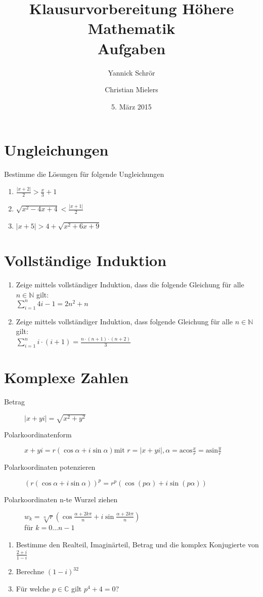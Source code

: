 \documentclass[11pt, a4paper]{article}
\title{Klausurvorbereitung Höhere Mathematik \\ Aufgaben}
\author{Yannick Schrör \and Christian Mielers}
\date{5. März 2015}
\providecommand{\abs}[1]{\left\lvert#1\right\rvert}
\providecommand{\acos}{\mathrm{acos}}
\providecommand{\asin}{\mathrm{asin}}
\begin{document}
\maketitle

\section{Ungleichungen}
Bestimme die Lösungen für folgende Ungleichungen
\begin{enumerate}
	\item $\displaystyle \frac{\abs{x+2}}{2} > \frac{x}{3} + 1$
	\item $\displaystyle \sqrt{x^2 - 4x + 4} < \frac{\abs{x+1}}{2}$
	\item $\displaystyle \abs{x+5} > 4 + \sqrt{x^2 + 6x + 9}$
\end{enumerate}

\section{Vollständige Induktion}
\begin{enumerate}[label=\alph*)]
	\item Zeige mittels vollständiger Induktion, dass die folgende Gleichung für alle $n \in \mathbb{N}$ gilt: \\
		$\displaystyle \sum_{i=1}^n 4i - 1 = 2n^2 + n$
	\item Zeige mittels vollständiger Induktion, dass folgende Gleichung für alle $n \in \mathbb{N}$ gilt: \\
		$\displaystyle \sum_{i=1}^n i \cdot (i + 1) = \frac{n\cdot(n+1)\cdot(n+2)}{3}$
\end{enumerate}

\section{Komplexe Zahlen}
	\begin{description}
		\item[Betrag] $\abs{x+yi} = \sqrt{x^2 + y^2}$
		\item[Polarkoordinatenform] $x+yi = r \left( \cos{\alpha} + i \sin{\alpha} \right) \text{mit } r=\abs{x+yi}, \alpha = \acos{\frac{x}{r}} = \asin{\frac{y}{r}}$
		\item[Polarkoordinaten potenzieren] $\left( r \left( \cos{\alpha} + i \sin{\alpha} \right) \right)^{p} = r^p \left( \cos \left( p \alpha \right) + i \sin \left(p \alpha \right) \right)$
		\item[Polarkoordinaten n-te Wurzel ziehen] $w_k = \sqrt[n]{r} \left( \cos \frac{\alpha + 2k\pi}{n} + i \sin \frac{\alpha + 2k\pi}{n} \right)$ \\ für $k = 0 \dots n-1$
	\end{description}
	\begin{enumerate}
		\item Bestimme den Realteil, Imaginärteil, Betrag und die komplex Konjugierte von $\displaystyle \frac{2+i}{1-i}$
		\item Berechne $\displaystyle (1-i)^{32}$
		\item Für welche $\displaystyle p\in\mathbb{C}$ gilt $p^4 + 4 = 0$?
	\end{enumerate}
\end{document}
